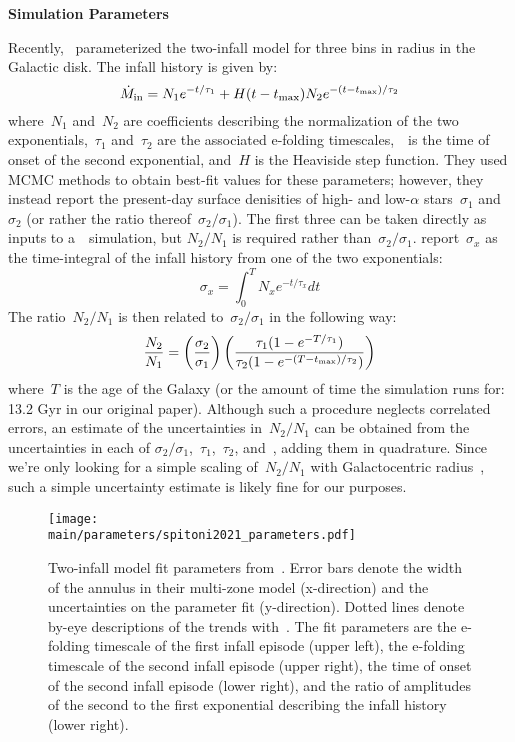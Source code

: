 \documentclass[\main/notes.tex]{subfiles}
\begin{document}
 
\begin{center} 
\textbf{{\Large Simulation Parameters}} 
\end{center} 

Recently,~\citet{Spitoni2021} parameterized the two-infall model for three 
bins in radius in the Galactic disk. 
The infall history is given by: 
\begin{equation} 
\dot{M}_\text{in} = N_1 e^{-t / \tau_1} + H(t - t_\text{max}) N_2 
e^{-(t - t_\text{max}) / \tau_2} 
\end{equation} 
where~$N_1$ and~$N_2$ are coefficients describing the normalization of the two 
exponentials,~$\tau_1$ and~$\tau_2$ are the associated e-folding 
timescales,~\tmax~is the time of onset of the second exponential, and~$H$ is the 
Heaviside step function. 
They used MCMC methods to obtain best-fit values for these parameters; however, 
they instead report the present-day surface denisities of high- and low-$\alpha$ 
stars~$\sigma_1$ and~$\sigma_2$ (or rather the ratio 
thereof~$\sigma_2/\sigma_1$). 
The first three can be taken directly as inputs to a~\vice~simulation, but 
$N_2/N_1$ is required rather than~$\sigma_2/\sigma_1$. 
\citet{Spitoni2021} report~$\sigma_x$ as the time-integral of the infall 
history from one of the two exponentials: 
\begin{equation} 
\sigma_x = \int_0^T N_x e^{-t / \tau_x} dt 
\end{equation} 
The ratio~$N_2/N_1$ is then related to~$\sigma_2/\sigma_1$ in the following way: 
\begin{equation} 
\frac{N_2}{N_1} = \left(\frac{\sigma_2}{\sigma_1}\right) 
\left(\frac{
	\tau_1(1 - e^{-T / \tau_1})
}{
	\tau_2(1 - e^{-(T - t_\text{max}) / \tau_2})
}\right) 
\end{equation} 
where~$T$ is the age of the Galaxy (or the amount of time the simulation runs 
for: 13.2 Gyr in our original paper). 
Although such a procedure neglects correlated errors, an estimate of the 
uncertainties in~$N_2/N_1$ can be obtained from the uncertainties in each of 
$\sigma_2/\sigma_1$,~$\tau_1$,~$\tau_2$, and~\tmax, adding them in quadrature. 
Since we're only looking for a simple scaling of~$N_2/N_1$ with Galactocentric 
radius~\rgal, such a simple uncertainty estimate is likely fine for our 
purposes. 

\begin{figure*} 
\centering 
\texttt{[image: \\main/parameters/spitoni2021\_parameters.pdf]} 
\caption{
Two-infall model fit parameters from~\citet{Spitoni2021}. 
Error bars denote the width of the annulus in their multi-zone model 
(x-direction) and the uncertainties on the parameter fit (y-direction). 
Dotted lines denote by-eye descriptions of the trends with~\rgal. 
The fit parameters are the e-folding timescale of the first infall episode 
(upper left), the e-folding timescale of the second infall episode (upper 
right), the time of onset of the second infall episode (lower right), and the 
ratio of amplitudes of the second to the first exponential describing the 
infall history (lower right). 
}
\label{fig:spitoni2021_parameters} 
\end{figure*} 
\end{document}
